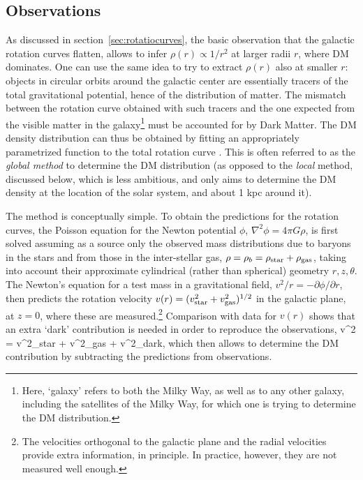 \subsection{Observations}\label{sec:rho_from_obs}
As discussed in section~\ref{sec:rotatiocurves}, the basic observation that the galactic rotation curves flatten, allows to infer $\rho(r) \propto 1/r^2$ at larger radii $r$, where DM dominates.
One can use the same idea to try to extract  $\rho(r)$ also at smaller $r$:
objects in circular orbits around the galactic center are essentially tracers of the total gravitational potential, hence of the distribution of matter. The mismatch between the rotation curve obtained with such tracers and the one expected from the visible matter in the galaxy\footnote{Here, `galaxy' refers to both the Milky Way, as well as to any other galaxy, including the satellites of the Milky Way, for which one is trying to determine the DM distribution.} must be accounted for by Dark Matter.
The DM density distribution can thus be obtained by fitting an appropriately parametrized function to the total rotation curve \cite{rhoDM_observations}. This is often referred to as the {\em global method} to determine the DM distribution (as opposed to the {\em local} method, discussed below, which is less ambitious, and only aims to determine the DM density at the location of the solar system, and about 1 kpc around it). 


The method is conceptually simple. To obtain the predictions for the rotation curves, the Poisson equation for the Newton potential $\phi$, $\nabla^2\phi = 4\pi G \rho$, is first solved assuming as a source only the observed mass distributions due to baryons in the stars
and from those in the inter-stellar gas,
$\rho=\rho_b=\rho_{\rm star}+\rho_{\rm gas}$, taking into account their
approximate cylindrical (rather than spherical) geometry $r,z,\theta$.
The Newton's equation for a test mass in a gravitational field, $v^2/r = -\partial \phi/\partial r$, 
then predicts the rotation velocity $v(r)=(v^2_{\rm star} + v^2_{\rm gas})^{1/2}$  in the galactic plane, at $z=0$,
where these are measured.\footnote{The velocities orthogonal to the galactic plane and the radial velocities
provide extra information, in principle. In practice, however,  they are not measured well enough.}
Comparison with data for $v(r)$ shows that an extra `dark' contribution is needed in order to reproduce the observations,
\beq
\label{eq:sum:v:squares}
v^2 = v^2_{\rm star} + v^2_{\rm gas} + v^2_{\rm dark},
\eeq
which then allows to determine the DM contribution by subtracting the predictions from observations.


